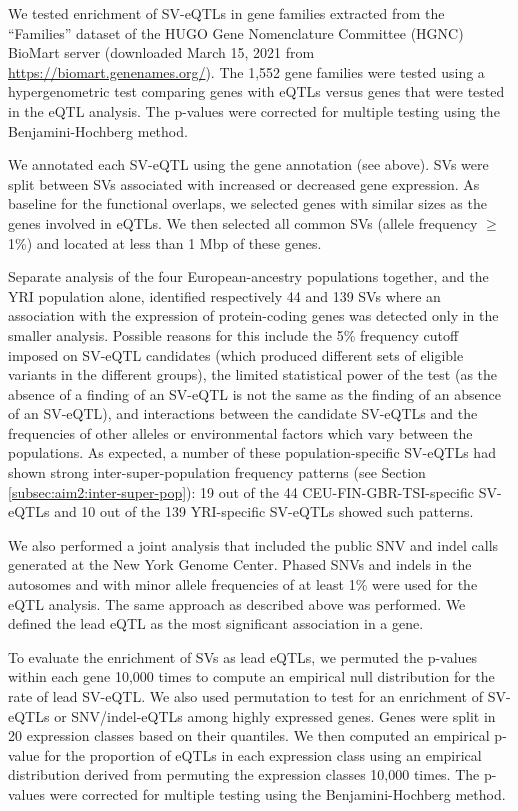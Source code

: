 \documentclass[11pt]{ucscthesis}
\begin{document}
We tested enrichment of SV-eQTLs in gene families extracted from the ``Families'' dataset of the HUGO Gene Nomenclature Committee (HGNC) BioMart server (downloaded March 15, 2021 from \url{https://biomart.genenames.org/}).
The 1,552 gene families were tested using a hypergenometric test comparing genes with eQTLs versus genes that were tested in the eQTL analysis.
The p-values were corrected for multiple testing using the Benjamini-Hochberg method.

We annotated each SV-eQTL using the gene annotation (see above).
SVs were split between SVs associated with increased or decreased gene expression.
As baseline for the functional overlaps, we selected genes with similar sizes as the genes involved in eQTLs.
We then selected all common SVs (allele frequency $\geq$ 1\%) and located at less than 1 Mbp of these genes.


Separate analysis of the four European-ancestry populations together, and the YRI population alone, identified respectively 44 and 139 SVs where an association with the expression of protein-coding genes was detected only in the smaller analysis.
Possible reasons for this include the 5\% frequency cutoff imposed on SV-eQTL candidates (which produced different sets of eligible variants in the different groups), the limited statistical power of the test (as the absence of a finding of an SV-eQTL is not the same as the finding of an absence of an SV-eQTL), and interactions between the candidate SV-eQTLs and the frequencies of other alleles or environmental factors which vary between the populations.
As expected, a number of these population-specific SV-eQTLs had shown strong inter-super-population frequency patterns (see Section \ref{subsec:aim2:inter-super-pop}):
19 out of the 44 CEU-FIN-GBR-TSI-specific SV-eQTLs and 10 out of the 139 YRI-specific SV-eQTLs showed such patterns.


We also performed a joint analysis that included the public SNV and indel calls generated at the New York Genome Center\cite{1000gp_nygc_2021}.
Phased SNVs and indels in the autosomes and with minor allele frequencies of at least 1\% were used for the eQTL analysis.
The same approach as described above was performed.
We defined the lead eQTL as the most significant association in a gene.

To evaluate the enrichment of SVs as lead eQTLs, we permuted the p-values within each gene 10,000 times to compute an empirical null distribution for the rate of lead SV-eQTL.
We also used permutation to test for an enrichment of SV-eQTLs or SNV/indel-eQTLs among highly expressed genes.
Genes were split in 20 expression classes based on their quantiles.
We then computed an empirical p-value for the proportion of eQTLs in each expression class using an empirical distribution derived from permuting the expression classes 10,000 times.
The p-values were corrected for multiple testing using the Benjamini-Hochberg method.
\end{document}
